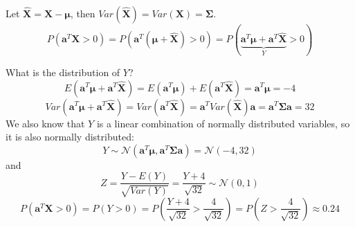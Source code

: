 \documentclass{article}
\let\normalmu\mu
\let\normalSigma\Sigma
\renewcommand{\mu}{\bm{\normalmu}} %
\renewcommand{\Sigma}{\bm{\normalSigma}} %
\begin{document}
Let ${\mathbf{\hat X}} = {\mathbf{X}} - {\mathbf{\mu }}$,
then $Var\left( {{\mathbf{\hat X}}} \right) = Var\left( {\mathbf{X}} \right) = {\mathbf{\Sigma }}$.
\[P\left( {{{\mathbf{a}}^T}{\mathbf{X}} > 0} \right) = P\left( {{{\mathbf{a}}^T}\left( {{\mathbf{\mu }} + {\mathbf{\hat X}}} \right) > 0} \right) = P\left( {\underbrace {{{\mathbf{a}}^T}{\mathbf{\mu }} + {{\mathbf{a}}^T}{\mathbf{\hat X}}}_Y} > 0 \right)\]

What is the distribution of $Y$?
\[E\left( {{{\mathbf{a}}^T}{\mathbf{\mu }} + {{\mathbf{a}}^T}{\mathbf{\hat X}}} \right) = E\left( {{{\mathbf{a}}^T}{\mathbf{\mu }}} \right) + E\left( {{{\mathbf{a}}^T}{\mathbf{\hat X}}} \right) = {{\mathbf{a}}^T}{\mathbf{\mu }} = -4\]
\[Var\left( {{{\mathbf{a}}^T}{\mathbf{\mu }} + {{\mathbf{a}}^T}{\mathbf{\hat X}}} \right) = Var\left( {{{\mathbf{a}}^T}{\mathbf{\hat X}}} \right) = {{\mathbf{a}}^T}Var\left( {{\mathbf{\hat X}}} \right){\mathbf{a}} = {{\mathbf{a}}^T}{\mathbf{\Sigma a}} = 32\]
We also know that $Y$ is a linear combination of normally distributed variables, so it is also normally distributed:
\[Y\sim \mathcal N({{\mathbf{a}}^T}{\mathbf{\mu }}, {{\mathbf{a}}^T}{\mathbf{\Sigma a}}) = \mathcal N(-4, 32)\]
and
\[Z=\frac{Y - E(Y)}{\sqrt{Var(Y)}} = \frac{Y + 4}{\sqrt{32}} \sim \mathcal N(0, 1)\]
\[P\left( {{{\mathbf{a}}^T}{\mathbf{X}} > 0} \right) = P\left( {Y > 0} \right) = P\left( {\frac{{Y + 4}}{{\sqrt {32} }} > \frac{4}{{\sqrt {32} }}} \right) = P\left( {Z > \frac{4}{{\sqrt {32} }}} \right) \approx 0.24\]
\end{document}
